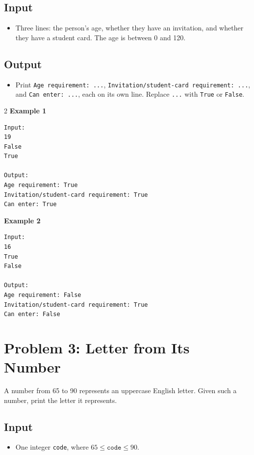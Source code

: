 \documentclass[12pt,oneside,openany]{article}
\begin{document}
\subsection*{Input}
\begin{itemize}
    \item Three lines: the person's age, whether they have an invitation, and whether they have a student card. The age is between 0 and 120.
\end{itemize}

\subsection*{Output}
\begin{itemize}
    \item Print \texttt{Age requirement: ...}, \texttt{Invitation/student-card requirement: ...}, and \texttt{Can enter: ...}, each on its own line. Replace \texttt{...} with \texttt{True} or \texttt{False}.
\end{itemize}

\vspace{0.2cm}

\begin{example*}{}{}
\begin{multicols}{2}
\textbf{Example 1}
\begin{verbatim}
Input:
19
False
True

Output:
Age requirement: True
Invitation/student-card requirement: True
Can enter: True
\end{verbatim}
\textbf{Example 2}
\begin{verbatim}
Input:
16
True
False

Output:
Age requirement: False
Invitation/student-card requirement: True
Can enter: False
\end{verbatim}
\end{multicols}
\end{example*}
\newpage
\section*{Problem 3: Letter from Its Number}

A number from 65 to 90 represents an uppercase English letter. Given such a number, print the letter it represents.

\subsection*{Input}
\begin{itemize}
    \item One integer \texttt{code}, where $65 \leq \texttt{code} \leq 90$.
\end{itemize}
\end{document}
